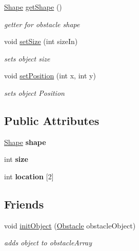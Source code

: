 \begin{DoxyCompactItemize}
\hyperlink{Obstacle_8h_a55b506070847a13554f8b879c1bfb37c}{Shape} \hyperlink{classObstacle_a7b64dfe1756dd4c661dd76cf7278acf0}{get\-Shape} ()
\begin{DoxyCompactList}\small\item\em getter for obstacle shape \end{DoxyCompactList}\item 
void \hyperlink{classObstacle_a3d25b60d0459b709bf76dd20559e8804}{set\-Size} (int size\-In)
\begin{DoxyCompactList}\small\item\em sets object size \end{DoxyCompactList}\item 
void \hyperlink{classObstacle_a9bf111365c98c8f873e09c358b1609fb}{set\-Position} (int x, int y)
\begin{DoxyCompactList}\small\item\em sets object Position \end{DoxyCompactList}\end{DoxyCompactItemize}
\subsection*{Public Attributes}
\begin{DoxyCompactItemize}
\item 
\hypertarget{classObstacle_ad4a5e60ad0cebb39768c2ea50a3e7278}{\hyperlink{Obstacle_8h_a55b506070847a13554f8b879c1bfb37c}{Shape} {\bfseries shape}}\label{classObstacle_ad4a5e60ad0cebb39768c2ea50a3e7278}

\item 
\hypertarget{classObstacle_ad1ab7793fdca3b58b4fb75df0934c8d3}{int {\bfseries size}}\label{classObstacle_ad1ab7793fdca3b58b4fb75df0934c8d3}

\item 
\hypertarget{classObstacle_a5516a879fd21b5d06ad3c63095328c40}{int {\bfseries location} \mbox{[}2\mbox{]}}\label{classObstacle_a5516a879fd21b5d06ad3c63095328c40}

\end{DoxyCompactItemize}
\subsection*{Friends}
\begin{DoxyCompactItemize}
\item 
void \hyperlink{classObstacle_a7c0f9b70e0203a036e79cd0852034844}{init\-Object} (\hyperlink{classObstacle}{Obstacle} obstacle\-Object)
\begin{DoxyCompactList}\small\item\em adds object to obstacle\-Array \end{DoxyCompactList}\end{DoxyCompactItemize}


